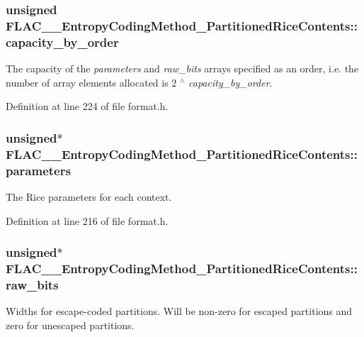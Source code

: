 \subsubsection[{\texorpdfstring{capacity\+\_\+by\+\_\+order}{capacity_by_order}}]{\setlength{\rightskip}{0pt plus 5cm}unsigned F\+L\+A\+C\+\_\+\+\_\+\+Entropy\+Coding\+Method\+\_\+\+Partitioned\+Rice\+Contents\+::capacity\+\_\+by\+\_\+order}\hypertarget{struct_f_l_a_c_____entropy_coding_method___partitioned_rice_contents_abb60aca8d98bf9299558f230dfe83bc1}{}\label{struct_f_l_a_c_____entropy_coding_method___partitioned_rice_contents_abb60aca8d98bf9299558f230dfe83bc1}
The capacity of the {\itshape parameters} and {\itshape raw\+\_\+bits} arrays specified as an order, i.\+e. the number of array elements allocated is 2 $^\wedge$ {\itshape capacity\+\_\+by\+\_\+order}. 

Definition at line 224 of file format.\+h.

\subsubsection[{\texorpdfstring{parameters}{parameters}}]{\setlength{\rightskip}{0pt plus 5cm}unsigned$\ast$ F\+L\+A\+C\+\_\+\+\_\+\+Entropy\+Coding\+Method\+\_\+\+Partitioned\+Rice\+Contents\+::parameters}\hypertarget{struct_f_l_a_c_____entropy_coding_method___partitioned_rice_contents_a06e97d40923f195410a65da9311ab6a2}{}\label{struct_f_l_a_c_____entropy_coding_method___partitioned_rice_contents_a06e97d40923f195410a65da9311ab6a2}
The Rice parameters for each context. 

Definition at line 216 of file format.\+h.

\subsubsection[{\texorpdfstring{raw\+\_\+bits}{raw_bits}}]{\setlength{\rightskip}{0pt plus 5cm}unsigned$\ast$ F\+L\+A\+C\+\_\+\+\_\+\+Entropy\+Coding\+Method\+\_\+\+Partitioned\+Rice\+Contents\+::raw\+\_\+bits}\hypertarget{struct_f_l_a_c_____entropy_coding_method___partitioned_rice_contents_a915eb5369d39924bc29c948c29834279}{}\label{struct_f_l_a_c_____entropy_coding_method___partitioned_rice_contents_a915eb5369d39924bc29c948c29834279}
Widths for escape-\/coded partitions. Will be non-\/zero for escaped partitions and zero for unescaped partitions. 

